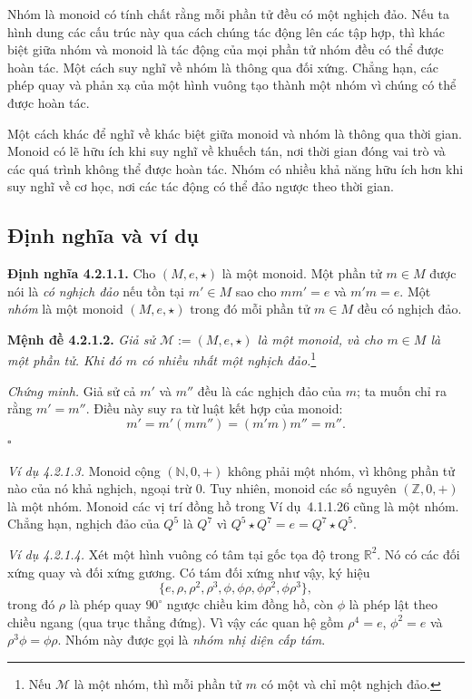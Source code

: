 Nhóm là monoid có tính chất rằng mỗi phần tử đều có một nghịch đảo. Nếu ta hình dung các cấu trúc này qua cách chúng tác động lên các tập hợp, thì khác biệt giữa nhóm và monoid là tác động của mọi phần tử nhóm đều có thể được hoàn tác. Một cách suy nghĩ về nhóm là thông qua đối xứng. Chẳng hạn, các phép quay và phản xạ của một hình vuông tạo thành một nhóm vì chúng có thể được hoàn tác.

Một cách khác để nghĩ về khác biệt giữa monoid và nhóm là thông qua thời gian. Monoid có lẽ hữu ích khi suy nghĩ về khuếch tán, nơi thời gian đóng vai trò và các quá trình không thể được hoàn tác. Nhóm có nhiều khả năng hữu ích hơn khi suy nghĩ về cơ học, nơi các tác động có thể đảo ngược theo thời gian.

\subsection{Định nghĩa và ví dụ}

\noindent\textbf{Định nghĩa 4.2.1.1.} Cho $(M,e,\star)$ là một monoid. Một phần tử $m\in M$ được nói là \emph{có nghịch đảo} nếu tồn tại $m'\in M$ sao cho $mm'=e$ và $m'm=e$. Một \emph{nhóm} là một monoid $(M,e,\star)$ trong đó mỗi phần tử $m\in M$ đều có nghịch đảo.

\noindent\textbf{Mệnh đề 4.2.1.2.} \emph{Giả sử $\mathcal{M}:=(M,e,\star)$ là một monoid, và cho $m\in M$ là một phần tử. Khi đó $m$ có nhiều nhất một nghịch đảo.}\footnote{Nếu $\mathcal{M}$ là một nhóm, thì mỗi phần tử $m$ có một và chỉ một nghịch đảo.}

\noindent\textit{Chứng minh.} Giả sử cả $m'$ và $m''$ đều là các nghịch đảo của $m$; ta muốn chỉ ra rằng $m'=m''$. Điều này suy ra từ luật kết hợp của monoid:
\[
m'=m'(mm'')=(m'm)m''=m''.
\]
\hfill$\square$

\noindent\textit{Ví dụ 4.2.1.3.} Monoid cộng $(\mathbb{N},0,+)$ không phải một nhóm, vì không phần tử nào của nó khả nghịch, ngoại trừ $0$. Tuy nhiên, monoid các số nguyên $(\mathbb{Z},0,+)$ là một nhóm. Monoid các vị trí đồng hồ trong Ví dụ~4.1.1.26 cũng là một nhóm. Chẳng hạn, nghịch đảo của $Q^5$ là $Q^7$ vì $Q^5\star Q^7=e=Q^7\star Q^5$.

\noindent\textit{Ví dụ 4.2.1.4.} Xét một hình vuông có tâm tại gốc tọa độ trong $\mathbb{R}^2$. Nó có các đối xứng quay và đối xứng gương. Có tám đối xứng như vậy, ký hiệu
\[
\{e,\rho,\rho^2,\rho^3,\phi,\phi\rho,\phi\rho^2,\phi\rho^3\},
\]
trong đó $\rho$ là phép quay $90^\circ$ ngược chiều kim đồng hồ, còn $\phi$ là phép lật theo chiều ngang (qua trục thẳng đứng). Vì vậy các quan hệ gồm $\rho^4=e$, $\phi^2=e$ và $\rho^3\phi=\phi\rho$. Nhóm này được gọi là \emph{nhóm nhị diện cấp tám}.

